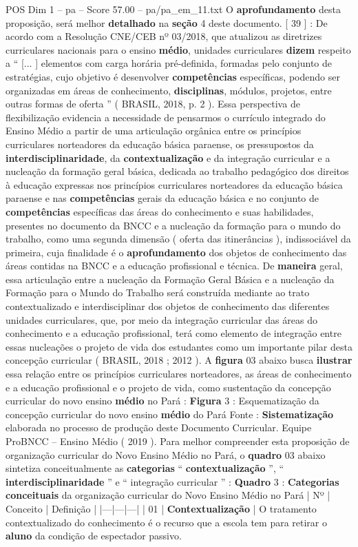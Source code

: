 \begin{textsample}{POS Dim 1 – pa – Score 57.00 – pa/pa\_em\_11.txt}
O \textbf{aprofundamento} desta proposição, será melhor \textbf{detalhado} na \textbf{seção} 4 deste documento. [ 39 ] : De acordo com a Resolução CNE/CEB nº 03/2018, que atualizou as diretrizes curriculares nacionais para o ensino \textbf{médio}, unidades curriculares \textbf{dizem} respeito a “ [... ] elementos com carga horária pré-definida, formadas pelo conjunto de estratégias, cujo objetivo é desenvolver \textbf{competências} específicas, podendo ser organizadas em áreas de conhecimento, \textbf{disciplinas}, módulos, projetos, entre outras formas de oferta ” ( BRASIL, 2018, p. 2 ).
Essa perspectiva de flexibilização evidencia a necessidade de pensarmos o currículo integrado do Ensino Médio a partir de uma articulação orgânica entre os princípios curriculares norteadores da educação básica paraense, os pressupostos da \textbf{interdisciplinaridade}, da \textbf{contextualização} e da integração curricular e a nucleação da formação geral básica, dedicada ao trabalho pedagógico dos direitos à educação expressas nos princípios curriculares norteadores da educação básica paraense e nas \textbf{competências} gerais da educação básica e no conjunto de \textbf{competências} específicas das áreas do conhecimento e suas habilidades, presentes no documento da BNCC e a nucleação da formação para o mundo do trabalho, como uma segunda dimensão ( oferta das itinerâncias ), indissociável da primeira, cuja finalidade é o \textbf{aprofundamento} dos objetos de conhecimento das áreas contidas na BNCC e a educação profissional e técnica.
De \textbf{maneira} geral, essa articulação entre a nucleação da Formação Geral Básica e a nucleação da Formação para o Mundo do Trabalho será construída mediante ao trato contextualizado e interdisciplinar dos objetos de conhecimento das diferentes unidades curriculares, que, por meio da integração curricular das áreas do conhecimento e a educação profissional, terá como elemento de integração entre essas nucleações o projeto de vida dos estudantes como um importante pilar desta concepção curricular ( BRASIL, 2018 ; 2012 ).
A \textbf{figura} 03 abaixo busca \textbf{ilustrar} essa relação entre os princípios curriculares norteadores, as áreas de conhecimento e a educação profissional e o projeto de vida, como sustentação da concepção curricular do novo ensino \textbf{médio} no Pará : \textbf{Figura} 3 : Esquematização da concepção curricular do novo ensino \textbf{médio} do Pará Fonte : \textbf{Sistematização} elaborada no processo de produção deste Documento Curricular.
Equipe ProBNCC – Ensino Médio ( 2019 ).
Para melhor compreender esta proposição de organização curricular do Novo Ensino Médio no Pará, o \textbf{quadro} 03 abaixo sintetiza conceitualmente as \textbf{categorias} “ \textbf{contextualização} ”, “ \textbf{interdisciplinaridade} ” e “ integração curricular ” : \textbf{Quadro} 3 : \textbf{Categorias} \textbf{conceituais} da organização curricular do Novo Ensino Médio no Pará | Nº | Conceito | Definição | |---|---|---| | 01 | \textbf{Contextualização} | O tratamento contextualizado do conhecimento é o recurso que a escola tem para retirar o \textbf{aluno} da condição de espectador passivo.

\end{textsample}
